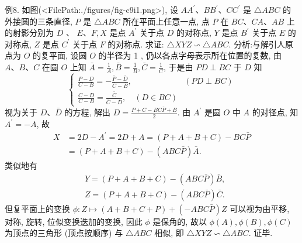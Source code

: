 例8. 如图(<FilePath:./figures/fig-c9i1.png>), 设 $A A^{\prime} 、 B B^{\prime} 、 C C^{\prime}$ 是 $\triangle A B C$ 的外接圆的三条直径, $P$ 是 $\triangle A B C$ 所在平面上任意一点, 点 $P$ 在 $B C 、 C A 、 A B$ 上的射影分别为 $D$ 、 $E 、 F, X$ 是点 $A^{\prime}$ 关于点 $D$ 的对称点, $Y$ 是点 $B^{\prime}$ 关于点 $E$ 的对称点, $Z$ 是点 $C^{\prime}$ 关于点 $F$ 的对称点.
求证: $\triangle X Y Z \backsim \triangle A B C$.
分析:与解引人原点为 $O$ 的复平面, 设圆 $O$ 的半径为 1 , 仍以各点字母表示所在位置的复数,
由 $A 、 B 、 C$ 在圆 $O$ 上知 $\bar{A}=\frac{1}{A}, \bar{B}=\frac{1}{B}, \bar{C}=\frac{1}{C}$, 于是由 $P D \perp B C$ 于 $D$ 知
$$
\begin{cases}\frac{P-D}{C-B}=-\frac{\bar{P}-\bar{D}}{\bar{C}-\bar{B}}, & (P D \perp B C) \\ \frac{C-D}{C-B}=\frac{\bar{C}}{\bar{C}-\bar{D}}, \quad(D \in B C) & \end{cases}
$$
视为关于 $D 、 \bar{D}$ 的方程, 解出 $D=\frac{P+C-B C \bar{P}+B}{2}$. 由 $A^{\prime}$ 是圆 $O$ 中 $A$ 的对径点, 知 $A^{\prime}=-A$, 故
$$
\begin{aligned}
X & =2 D-A^{\prime}=2 D+A=(P+A+B+C)-B C \bar{P} \\
& =(P+A+B+C)-(A B C \bar{P}) \bar{A} .
\end{aligned}
$$
类似地有
$$
\begin{aligned}
& Y=(P+A+B+C)-(A B C \bar{P}) \bar{B}, \\
& Z=(P+A+B+C)-(A B C \bar{P}) \bar{C} .
\end{aligned}
$$
但复平面上的变换 $\phi: Z \mapsto(A+B+C+P)+(-A B C \bar{P}) Z$ 可以视为由平移, 对称, 旋转, 位似变换迭加的变换, 因此 $\phi$ 是保角的, 故以 $\phi(A), \phi(B), \phi(C)$ 为顶点的三角形 (顶点按顺序) 与 $\triangle A B C$ 相似, 即 $\triangle X Y Z \backsim \triangle A B C$. 证毕.



